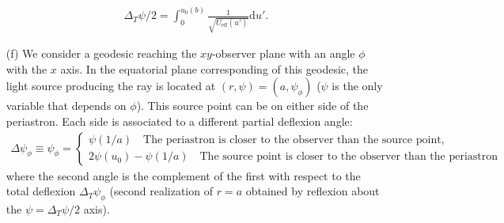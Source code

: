 \documentclass[10pt, a4paper]{article}
\begin{document}
\begin{enumerate}
  \begin{align*}
    \Delta_T \psi/2 = \int_{0}^{u_0(b)} \frac{1}{\sqrt{U_{\text{eff}}(u')}}\text{d}u'. 
  \end{align*}
  \item[(f)]  We consider a geodesic reaching the $xy$-observer plane with an angle $\phi$ with the $x$ axis. In the equatorial plane corresponding of this geodesic, the light source producing the ray is located at $(r, \psi) = (a, \psi_\phi)$ ($\psi$ is the only variable that depends on $\phi$). This source point can be on either side of the periastron. Each side is associated to a different partial deflexion angle:
  \begin{align*}
  \Delta \psi_\phi \equiv \psi_\phi=\left\{\begin{array}{l}\psi(1/a) \quad \text{The periastron is closer to the observer than the source point,} \\ 2\psi\left(u_0\right)-\psi\left(1 / a\right)\quad \text{The source point is closer to the observer than the periastron}\end{array}\right.
  \end{align*}
  where the second angle is the complement of the first with respect to the total deflexion $\Delta_T \psi_\phi$ (second realization of $r = a$ obtained by reflexion about the $\psi = \Delta_T \psi/2$ axis). 
\end{enumerate}
\newpage
\end{document}
